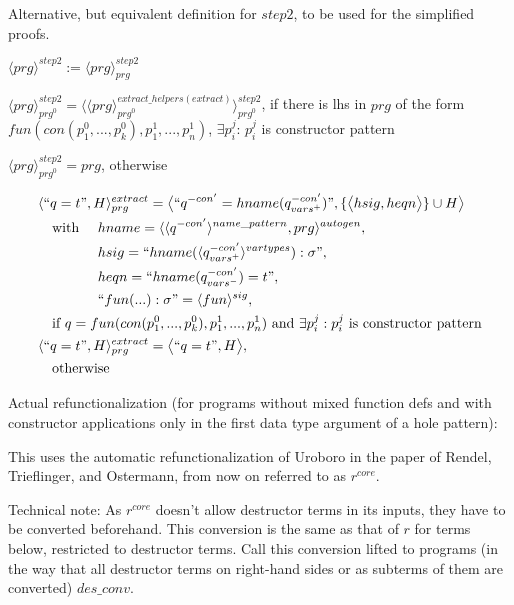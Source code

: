 \documentclass[11pt]{article} %
\begin{document}
\begin{framed}

Alternative, but equivalent definition for $step2$, to be used for the simplified proofs.

$\langle prg \rangle^{step2} := \langle prg \rangle^{step2}_{prg}$

$\langle prg \rangle^{step2}_{prg^0} = \langle \langle prg \rangle^{extract\_helpers(extract)}_{prg^0} \rangle^{step2}_{prg^0}$, if there is lhs in $prg$ of the form $fun(con(p_1^0, ..., p_k^0), p^1_1, ..., p^1_n)$, $\exists p_i^j$: $p_i^j$ is constructor pattern

$\langle prg \rangle^{step2}_{prg^0} = prg$, otherwise

\begin{alignat*}{3}
&\langle `` q = t ", H \rangle^{extract}_{prg} = \big\langle `` q^{-con'} = hname (q^{-con'}_{vars^+}) ", \{\big\langle hsig, heqn \big\rangle\} \cup H \big\rangle \span\span \\
&\quad \textrm{with } && hname = \langle \langle q^{-con'} \rangle^{name\_pattern}, prg \rangle^{autogen}, \\
&\quad && hsig = `` hname(\langle q^{-con'}_{vars^+} \rangle^{vartypes}): \sigma ", \\
&\quad && heqn = `` hname(q^{-con'}_{vars^-}) = t ", \\
&\quad && `` fun(...): \sigma " = \langle fun \rangle^{sig}, \\
&\quad \textrm{if } q = fun(con(p_1^0, ..., p_k^0), p^1_1, ..., p^1_n) \textrm{ and } \exists p_i^j: p_i^j \textrm{ is constructor pattern} \span\span \\
&\langle `` q = t ", H \rangle^{extract}_{prg} = \big\langle `` q = t ", H \big\rangle, \span\span \\
&\quad \textrm{otherwise} \span\span
\end{alignat*}

\end{framed}

Actual refunctionalization (for programs without mixed function defs and with constructor applications only in the first data type argument of a hole pattern):

This uses the automatic refunctionalization of Uroboro in the paper of Rendel, Trieflinger, and Ostermann, from now on referred to as $r^{core}$.

Technical note: As $r^{core}$ doesn't allow destructor terms in its inputs, they have to be converted beforehand. This conversion is the same as that of $r$ for terms below, restricted to destructor terms. Call this conversion lifted to programs (in the way that all destructor terms on right-hand sides or as subterms of them are converted) $des\_conv$.
\end{document}
